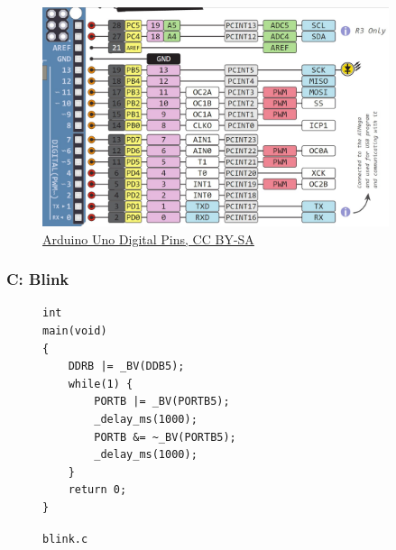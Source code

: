 \documentclass{beamer} \usetheme{Madrid}
\begin{document}
\begin{frame}
    \vfill
    \begin{center}
    \begin{figure}
        \includegraphics[width=4in]{arduinopins.png}
        \caption{\href{https://www.circuito.io/blog/arduino-uno-pinout/}{Arduino Uno Digital Pins, CC BY-SA}}
    \end{figure}
    \end{center}
    \vfill
\end{frame}

\begin{frame}[fragile]
    \frametitle{C: Blink}
    \begin{figure}
        \begin{verbatim}
int
main(void)
{
    DDRB |= _BV(DDB5);
    while(1) {
        PORTB |= _BV(PORTB5);
        _delay_ms(1000);
        PORTB &= ~_BV(PORTB5);
        _delay_ms(1000);
    }
    return 0;
}
        \end{verbatim}
        \caption{\texttt{blink.c}}
    \end{figure}
\end{frame}
\end{document}
